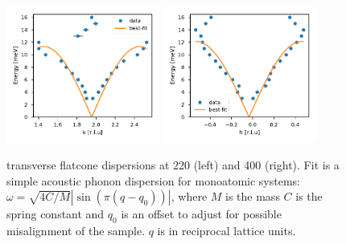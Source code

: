 \begin{figure}
    \centering
    \includegraphics[width=0.45\textwidth]{fig/lowen/dispersion_220T.pdf}
    \includegraphics[width=0.45\textwidth]{fig/lowen/dispersion_400T.pdf}
    \caption[flatcone dispersion 220T/400T]{transverse flatcone dispersions at 220 (left) and 400 (right). Fit is a simple acoustic phonon dispersion for monoatomic systems: $\omega = \sqrt{4C/M} | \sin ( \pi (q-q_0) ) | $, where $M$ is the mass $C$ is the spring constant and $q_0$ is an offset to adjust for possible misalignment of the sample. $q$ is in reciprocal lattice units.}
\end{figure}

